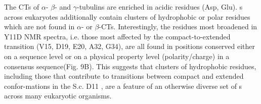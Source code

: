 The CTs of $\alpha$- $\beta$- and $\gamma$-tubulins are enriched in acidic residues (Asp, Glu). \gct{} s across eukaryotes additionally contain clusters of hydrophobic or polar residues which are not found in $\alpha$- or $\beta$-CTs. Interestingly, the residues most broadened in Y11D NMR spectra, i.e. those most affected by the compact-to-extended transition (V15, D19, E20, A32, G34), are all found in positions conserved either on a sequence level or on a physical property level (polarity/charge) in a consensus \gct{} sequence(Fig. 9B). This suggests that clusters of hydrophobic residues, including those that contribute to transitions between compact and extended confor-mations in the S.c. D11 \gct{}, are a feature of an otherwise diverse set of \gct{} s across many eukaryotic organisms.  


